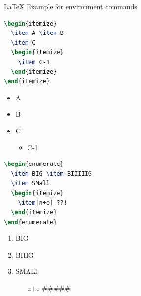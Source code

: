 \documentclass{beamer}
\begin{document}
\begin{frame}[fragile]{\LaTeX{} Example for environment commands}
    \begin{minipage}{0.5\linewidth}
\begin{lstlisting}[language=TeX]
\begin{itemize}
  \item A \item B
  \item C
  \begin{itemize}
    \item C-1
  \end{itemize}
\end{itemize}
\end{lstlisting}
    \end{minipage}\hspace{1cm}
    \begin{minipage}{0.3\linewidth}
        \begin{itemize}
            \item A
            \item B
            \item C
            \begin{itemize}
                \item C-1
            \end{itemize}
        \end{itemize}
    \end{minipage}
    \medskip
    \pause
    \begin{minipage}{0.5\linewidth}
\begin{lstlisting}[language=TeX]
\begin{enumerate}
  \item BIG \item BIIIIIG
  \item SMall
  \begin{itemize}
    \item[n+e] ??!
  \end{itemize}
\end{enumerate}
\end{lstlisting}
    \end{minipage}\hspace{1cm}
    \begin{minipage}{0.3\linewidth}
        \begin{enumerate}
            \item BIG
            \item BIIIG
            \item SMALl
            \begin{itemize}
                \item[n+e] \#\#\#\#\#
            \end{itemize}
        \end{enumerate}
    \end{minipage}
\end{frame}
\end{document}
